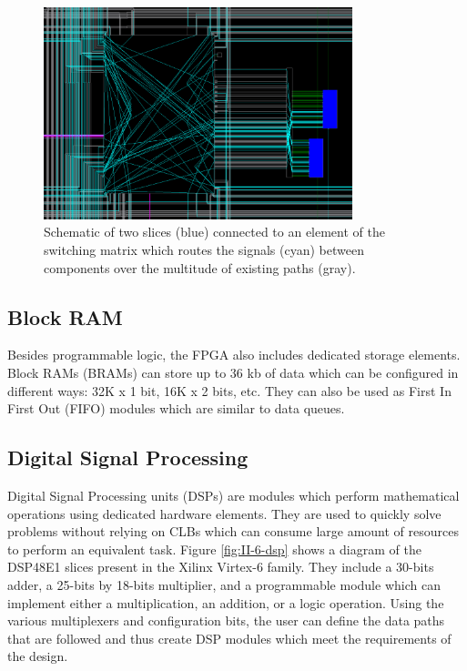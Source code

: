       \begin{figure}[h!]
        \centering
        \includegraphics[width=0.8\textwidth]{img/II-6-irradiation/switch.png}
        \caption{Schematic of two slices (blue) connected to an element of the switching matrix which routes the signals (cyan) between components over the multitude of existing paths (gray).}
        \label{fig:II-6-switch}
      \end{figure}

    \subsection{Block RAM}

      Besides programmable logic, the FPGA also includes dedicated storage elements. Block RAMs \cite{VIRTEX-RAM} (BRAMs) can store up to 36 kb of data which can be configured in different ways: 32K x 1 bit, 16K x 2 bits, etc. They can also be used as First In First Out (FIFO) modules which are similar to data queues.

    \subsection{Digital Signal Processing}

      Digital Signal Processing units (DSPs) \cite{VIRTEX-DSP} are modules which perform mathematical operations using dedicated hardware elements. They are used to quickly solve problems without relying on CLBs which can consume large amount of resources to perform an equivalent task. Figure \ref{fig:II-6-dsp} shows a diagram of the DSP48E1 slices present in the Xilinx Virtex-6 family. They include a 30-bits adder, a 25-bits by 18-bits multiplier, and a programmable module which can implement either a multiplication, an addition, or a logic operation. Using the various multiplexers and configuration bits, the user can define the data paths that are followed and thus create DSP modules which meet the requirements of the design.

